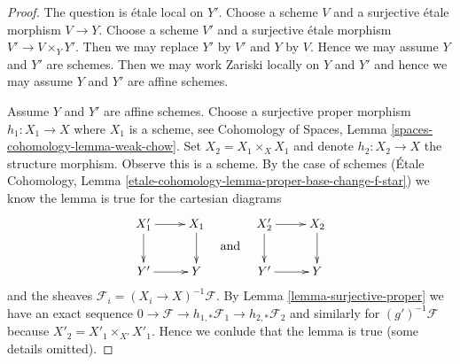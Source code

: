 \documentclass{stacks-project}
\theoremstyle{plain}
\theoremstyle{definition}
\theoremstyle{remark}
\numberwithin{equation}{subsection}
\begin{document}
\begin{proof}
The question is \'etale local on $Y'$. Choose a scheme $V$ and a surjective
\'etale morphism $V \to Y$. Choose a scheme $V'$ and a surjective \'etale
morphism $V' \to V \times_Y Y'$. Then we may replace $Y'$ by $V'$ and
$Y$ by $V$. Hence we may assume $Y$ and $Y'$ are schemes.
Then we may work Zariski locally on $Y$ and $Y'$ and hence we may
assume $Y$ and $Y'$ are affine schemes.

\medskip\noindent
Assume $Y$ and $Y'$ are affine schemes. Choose a surjective proper morphism
$h_1 : X_1 \to X$ where $X_1$ is a scheme, see
Cohomology of Spaces, Lemma \ref{spaces-cohomology-lemma-weak-chow}.
Set $X_2 = X_1 \times_X X_1$ and denote
$h_2 : X_2 \to X$ the structure morphism. Observe this is a scheme.
By the case of schemes
(\'Etale Cohomology, Lemma
\ref{etale-cohomology-lemma-proper-base-change-f-star})
we know the lemma is true for the cartesian diagrams
$$
\vcenter{
\xymatrix{
X'_1 \ar[r] \ar[d] & X_1 \ar[d] \\
Y' \ar[r] & Y
}
}
\quad\text{and}\quad
\vcenter{
\xymatrix{
X'_2 \ar[r] \ar[d] & X_2 \ar[d] \\
Y' \ar[r] & Y
}
}
$$
and the sheaves $\mathcal{F}_i = (X_i \to X)^{-1}\mathcal{F}$.
By Lemma \ref{lemma-surjective-proper} we have an exact sequence
$0 \to \mathcal{F} \to h_{1, *}\mathcal{F}_1 \to h_{2, *}\mathcal{F}_2$
and similarly for $(g')^{-1}\mathcal{F}$ because
$X'_2 = X'_1 \times_{X'} X'_1$. Hence we conlude that the
lemma is true (some details omitted).
\end{proof}
\end{document}
